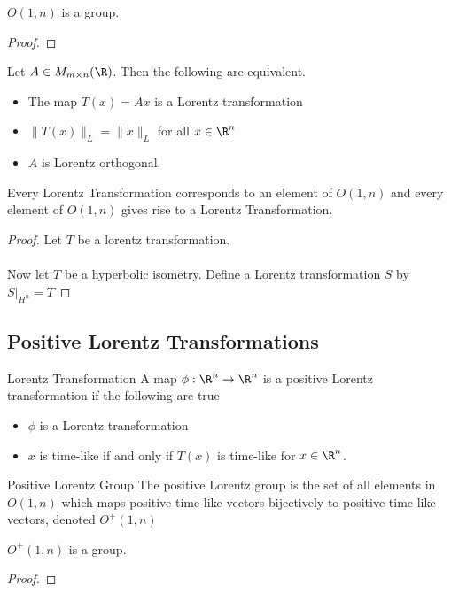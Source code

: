 \begin{prp}{}{} $O(1,n)$ is a group. \tcbline
\begin{proof}
\end{proof}
\end{prp}

\begin{prp}{}{} Let $A\in M_{m\times n}(\R)$. Then the following are equivalent. 
\begin{itemize}
\item The map $T(x)=Ax$ is a Lorentz transformation
\item $\|T(x)\|_L=\|x\|_L$ for all $x\in\R^n$
\item $A$ is Lorentz orthogonal. 
\end{itemize}
\end{prp}

\begin{crl}{}{} Every Lorentz Transformation corresponds to an element of $O(1,n)$ and every element of $O(1,n)$ gives rise to a Lorentz Transformation. \tcbline
\begin{proof}
Let $T$ be a lorentz transformation. \\~\\
Now let $T$ be a hyperbolic isometry. Define a Lorentz transformation $S$ by $S|_{H^n}=T$
\end{proof}
\end{crl}

\subsection{Positive Lorentz Transformations}
\begin{defn}{Lorentz Transformation}{} A map $\phi:\R^n\to\R^n$ is a positive Lorentz transformation if the following are true
\begin{itemize}
\item $\phi$ is a Lorentz transformation
\item $x$ is time-like if and only if $T(x)$ is time-like for $x\in\R^n$. 
\end{itemize}
\end{defn}

\begin{defn}{Positive Lorentz Group}{} The positive Lorentz group is the set of all elements in $O(1,n)$ which maps positive time-like vectors bijectively to positive time-like vectors, denoted $O^+(1,n)$
\end{defn}

\begin{prp}{}{} $O^+(1,n)$ is a group. \tcbline
\begin{proof}
\end{proof}
\end{prp}

